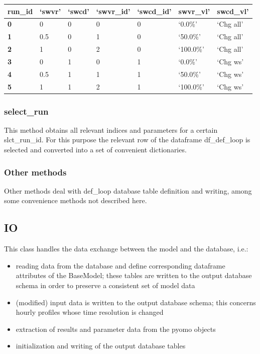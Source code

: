 \documentclass[]{article}
\begin{document}
\begin{tabular}{@{}lllllll@{}}
\toprule
run\_id & `swvr' & `swcd' & `swvr\_id' & `swcd\_id' & swvr\_vl' &
swcd\_vl'
\\
\midrule
\textbf{0} & 0 & 0 & 0 & 0 & `0.0\%' & `Chg all'
\\
\textbf{1} & 0.5 & 0 & 1 & 0 & `50.0\%' & `Chg all'
\\
\textbf{2} & 1 & 0 & 2 & 0 & `100.0\%' & `Chg all'
\\
\textbf{3} & 0 & 1 & 0 & 1 & `0.0\%' & `Chg ws'
\\
\textbf{4} & 0.5 & 1 & 1 & 1 & `50.0\%' & `Chg ws'
\\
\textbf{5} & 1 & 1 & 2 & 1 & `100.0\%' & `Chg ws'
\\
\bottomrule
\end{tabular}

\subsubsection{select\_run}\label{selectux5frun}

This method obtains all relevant indices and parameters for a certain
slct\_run\_id. For this purpose the relevant row of the dataframe
df\_def\_loop is selected and converted into a set of convenient
dictionaries.

\subsubsection{Other methods}\label{other-methods}

Other methods deal with def\_loop database table definition and writing,
among some convenience methods not described here.

\subsection{IO}\label{io}

This class handles the data exchange between the model and the database,
i.e.:

\begin{itemize}
\itemsep1pt\parskip0pt
\item
  reading data from the database and define corresponding dataframe
  attributes of the BaseModel; these tables are written to the output
  database schema in order to preserve a consistent set of model data
\item
  (modified) input data is written to the output database schema; this
  concerns hourly profiles whose time resolution is changed\\
\item
  extraction of results and parameter data from the pyomo objects
\item
  initialization and writing of the output database tables
\end{itemize}
\end{document}
